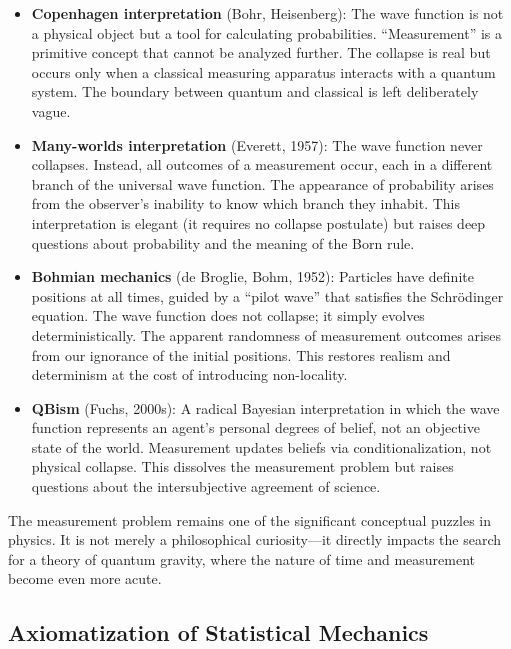 \begin{itemize}
    \item \textbf{Copenhagen interpretation} (Bohr, Heisenberg): The wave function is not a physical object but a tool for calculating probabilities. ``Measurement'' is a primitive concept that cannot be analyzed further. The collapse is real but occurs only when a classical measuring apparatus interacts with a quantum system. The boundary between quantum and classical is left deliberately vague.

    \item \textbf{Many-worlds interpretation} (Everett, 1957): The wave function never collapses. Instead, all outcomes of a measurement occur, each in a different branch of the universal wave function. The appearance of probability arises from the observer's inability to know which branch they inhabit. This interpretation is elegant (it requires no collapse postulate) but raises deep questions about probability and the meaning of the Born rule.

    \item \textbf{Bohmian mechanics} (de Broglie, Bohm, 1952): Particles have definite positions at all times, guided by a ``pilot wave'' that satisfies the Schr\"odinger equation. The wave function does not collapse; it simply evolves deterministically. The apparent randomness of measurement outcomes arises from our ignorance of the initial positions. This restores realism and determinism at the cost of introducing non-locality.

    \item \textbf{QBism} (Fuchs, 2000s): A radical Bayesian interpretation in which the wave function represents an agent's personal degrees of belief, not an objective state of the world. Measurement updates beliefs via conditionalization, not physical collapse. This dissolves the measurement problem but raises questions about the intersubjective agreement of science.
\end{itemize}

The measurement problem remains one of the significant conceptual puzzles in physics. It is not merely a philosophical curiosity---it directly impacts the search for a theory of quantum gravity, where the nature of time and measurement become even more acute.

\subsection{Axiomatization of Statistical Mechanics}


